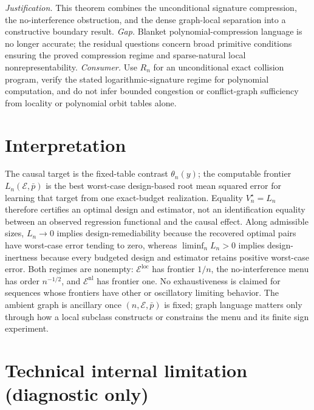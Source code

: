 \documentclass{article}
\begin{document}
\par\smallskip\noindent \textit{Justification.} This theorem combines the unconditional signature compression, the no-interference obstruction, and the dense graph-local separation into a constructive boundary result. \textit{Gap.} Blanket polynomial-compression language is no longer accurate; the residual questions concern broad primitive conditions ensuring the proved compression regime and sparse-natural local nonrepresentability. \textit{Consumer.} Use \(R_n\) for an unconditional exact collision program, verify the stated logarithmic-signature regime for polynomial computation, and do not infer bounded congestion or conflict-graph sufficiency from locality or polynomial orbit tables alone.

\section{Interpretation}

The causal target is the fixed-table contrast \(\theta_n(y)\); the computable frontier \(L_n(\mathcal E,\bar p)\) is the best worst-case design-based root mean squared error for learning that target from one exact-budget realization. Equality \(V_n^\star=L_n\) therefore certifies an optimal design and estimator, not an identification equality between an observed regression functional and the causal effect. Along admissible sizes, \(L_n\to0\) implies design-remediability because the recovered optimal pairs have worst-case error tending to zero, whereas \(\liminf_nL_n>0\) implies design-inertness because every budgeted design and estimator retains positive worst-case error. Both regimes are nonempty: \(\mathcal E^{\mathrm{loc}}\) has frontier \(1/n\), the no-interference menu has order \(n^{-1/2}\), and \(\mathcal E^{\mathrm{nl}}\) has frontier one. No exhaustiveness is claimed for sequences whose frontiers have other or oscillatory limiting behavior. The ambient graph is ancillary once \((n,\mathcal E,\bar p)\) is fixed; graph language matters only through how a local subclass constructs or constrains the menu and its finite sign experiment.

\section*{Technical internal limitation (diagnostic only)}
\end{document}
